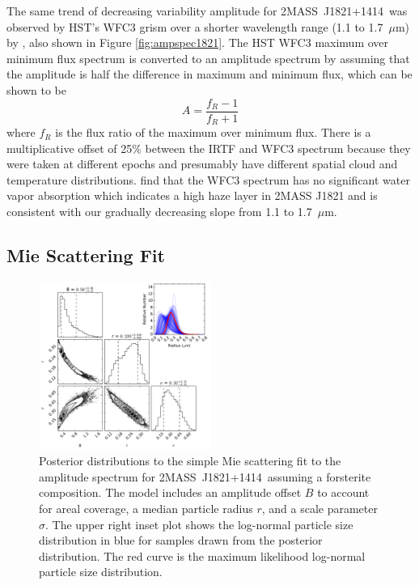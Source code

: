 \documentclass[twocolumn]{aastex6}
\newcommand{\shb}{2MASS~J1821+1414}
\begin{document}
The same trend of decreasing variability amplitude for \shb\ was observed by HST's WFC3 grism over a shorter wavelength range (1.1 to 1.7~$\mu$m) by \citet{2015ApJ...798L..13Y}, also shown in Figure \ref{fig:ampspec1821}.
The HST WFC3 maximum over minimum flux spectrum is converted to an amplitude spectrum by assuming that the amplitude is half the difference in maximum and minimum flux, which can be shown to be 
\begin{equation}\label{eq:ampFromRatio}
A  = \frac{f_R - 1}{f_R + 1}
\end{equation}
where $f_R$ is the flux ratio of the maximum over minimum flux.
There is a multiplicative offset of 25\% between the IRTF and WFC3 spectrum because they were taken at different epochs and presumably have different spatial cloud and temperature distributions.
\citet{2015ApJ...798L..13Y} find that the WFC3 spectrum has no significant water vapor absorption which indicates a high haze layer in 2MASS J1821 and is consistent with our gradually decreasing slope from 1.1 to 1.7~$\mu$m.

\subsection{Mie Scattering Fit}

\begin{figure}
\begin{centering}
\includegraphics[width=0.5\textwidth]{corner_j1821_mie_sc.pdf}
\caption{Posterior distributions to the simple Mie scattering fit to the amplitude spectrum for \shb\ assuming a forsterite composition.
The model includes an amplitude offset $B$ to account for areal coverage, a median particle radius $r$, and a scale parameter $\sigma$.
The upper right inset plot shows the log-normal particle size distribution in blue for samples drawn from the posterior distribution.
The red curve is the maximum likelihood log-normal particle size distribution.}\label{fig:corner1821mie}
\end{centering}
\end{figure}
\end{document}
